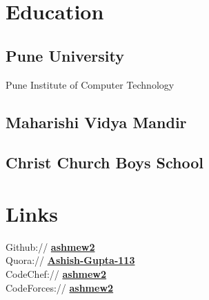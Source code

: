 \documentclass[letterpaper]{deedy-resume} %
\begin{document}
\begin{minipage}[t]{0.33\textwidth} %


\section{Education} 

\subsection{Pune University}

Pune Institute of Computer Technology \\

\sectionspace %


\subsection{Maharishi Vidya Mandir}


\sectionspace %

\subsection{Christ Church Boys School}


\sectionspace %



\section{Links} 

Github:// \href{https://github.com/ashmew2}{\bf ashmew2} \\
Quora:// \href{http://www.quora.com/Ashish-Gupta-113}{\bf Ashish-Gupta-113} \\
CodeChef:// \href{http://www.codechef.com/users/ashmew2}{\bf ashmew2} \\
CodeForces:// \href{http://codeforces.com/profile/ashmew2}{\bf ashmew2} \\
\sectionspace %


\end{minipage}
\end{document}
